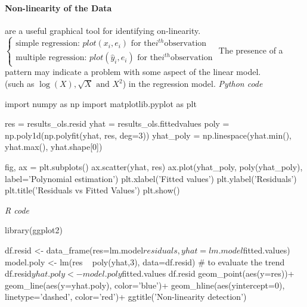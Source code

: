 \paragraph{Non-linearity of the Data}
 are a useful graphical tool for identifying 
on-linearity.$\begin{cases}\text{simple regression: }plot(x_{i},e_{i})
	\text{ for the} i^{th} \text{observation}\\\text{multiple regression: }plot(
	\widehat{y}_{i},e_{i})\text{ for the} i^{th} \text{observation}\end{cases}$
The presence of a pattern may indicate a problem with some aspect of
the linear model.\\ (such as $\log\left(X
\right),\sqrt{X}\text{ and }X^{2}$) in the regression model.
\emph{Python code}
\begin{python}
import numpy as np
import matplotlib.pyplot as plt

res = results_ols.resid
yhat = results_ols.fittedvalues
poly = np.poly1d(np.polyfit(yhat, res, deg=3))
yhat_poly = np.linespace(yhat.min(), yhat.max(), yhat.shape[0])

fig, ax = plt.subplots()
ax.scatter(yhat, res)
ax.plot(yhat_poly, poly(yhat_poly), label='Polynomial estimation')
plt.xlabel('Fitted values')
plt.ylabel('Residuals')
plt.title('Residuals vs Fitted Values')
plt.show()
\end{python}

\emph{R code}
\begin{rcode}[deletekeywords={df, resid, lm, model, residuals, fitted, poly}]
library(ggplot2)

df.resid <- data_frame(res=lm.model$residuals, yhat=lm.model$fitted.values)
model.poly <- lm(res ~ poly(yhat,3), data=df.resid) # to evaluate the trend
df.resid$yhat.poly <- model.poly$fitted.values
df.resid %
  geom_point(aes(y=res))+
  geom_line(aes(y=yhat.poly), color='blue')+
  geom_hline(aes(yintercept=0), linetype='dashed', color='red')+
  ggtitle('Non-linearity detection')
\end{rcode}

